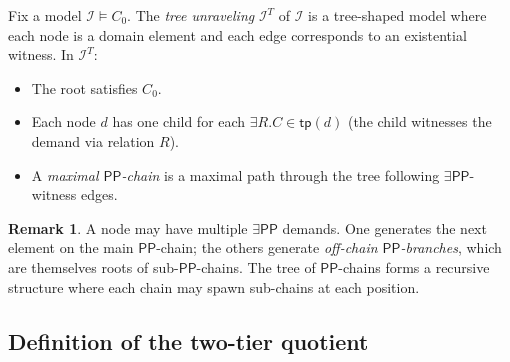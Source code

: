 \documentclass[a4paper,11pt]{article}
\theoremstyle{definition}
\newtheorem{remark}[theorem]{Remark}
\newcommand{\PP}{\ensuremath{\mathsf{PP}}}
\newcommand{\tp}{\ensuremath{\mathsf{tp}}}
\newcommand{\interp}{\ensuremath{\mathcal{I}}}
\begin{document}
Fix a model $\interp \models C_0$.  The \emph{tree unraveling}
$\interp^T$ of $\interp$ is a tree-shaped model where each node is a
domain element and each edge corresponds to an existential witness.
In $\interp^T$:
\begin{itemize}
\item The root satisfies $C_0$.
\item Each node $d$ has one child for each $\exists R.C \in \tp(d)$
  (the child witnesses the demand via relation $R$).
\item A \emph{maximal $\PP$-chain} is a maximal path through the
  tree following $\exists\PP$-witness edges.
\end{itemize}

\begin{remark}
A node may have multiple $\exists\PP$ demands.  One generates the
next element on the main $\PP$-chain; the others generate
\emph{off-chain $\PP$-branches}, which are themselves roots of
sub-$\PP$-chains.  The tree of $\PP$-chains forms a recursive
structure where each chain may spawn sub-chains at each position.
\end{remark}

\subsection{Definition of the two-tier quotient}
\end{document}

